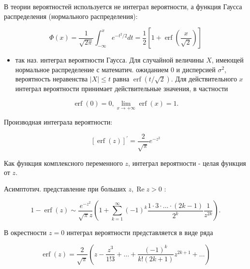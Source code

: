 \documentclass[10pt]{article}
\begin{document}
В теории вероятностей используется не интеграл вероятности, а функция Гаусса распределения (нормального распределения):



\[

\Phi(x)=\frac{1}{\sqrt{2 \pi}} \int_{-\infty}^{x} e^{-t^{2} / 2} d t=\frac{1}{2}\left[1+\operatorname{erf}\left(\frac{x}{\sqrt{2}}\right)\right]

\]



\begin{itemize}

  \item так наз. интеграл вероятности Гаусса. Для случайной величины $X$, имеющей нормальное распределение с математич. ожиданием 0 и дисперсией $\sigma^{2}$, вероятность неравенства $|X| \leqslant t$ равна $\operatorname{erf}(t / \sqrt{2})$. Для действительного $x$ интеграл вероятности принимает действительные значения, в частности

\end{itemize}



\[

\operatorname{erf}(0)=0, \lim _{x \rightarrow+\infty} \operatorname{erf}(x)=1 .

\]



Производная интеграла вероятности:



\[

[\operatorname{erf}(z)]^{\prime}=\frac{2}{\sqrt{\pi}} e^{-z^{2}}

\]



Как функция комплексного переменного $z$, интеграл вероятности - целая функция от $z$.



Асимптотич. представление при больших $z, \operatorname{Re} z>0$ :



\[

1-\operatorname{erf}(z) \sim \frac{e^{-z^{2}}}{\sqrt{\pi} z}\left(1+\sum_{k=1}^{\infty}(-1)^{k} \frac{1 \cdot 3 \cdot \ldots \cdot(2 k-1)}{2^{k}} \frac{1}{z^{2 k}}\right) .

\]



В окрестности $z=0$ интеграл вероятности представляется в виде ряда



\[

\operatorname{erf}(z)=\frac{2}{\sqrt{\pi}}\left(z-\frac{z^{3}}{1 ! 3}+\ldots+\frac{(-1)^{k}}{k !(2 k+1)} z^{2 k+1}+\ldots\right)

\]
\end{document}
